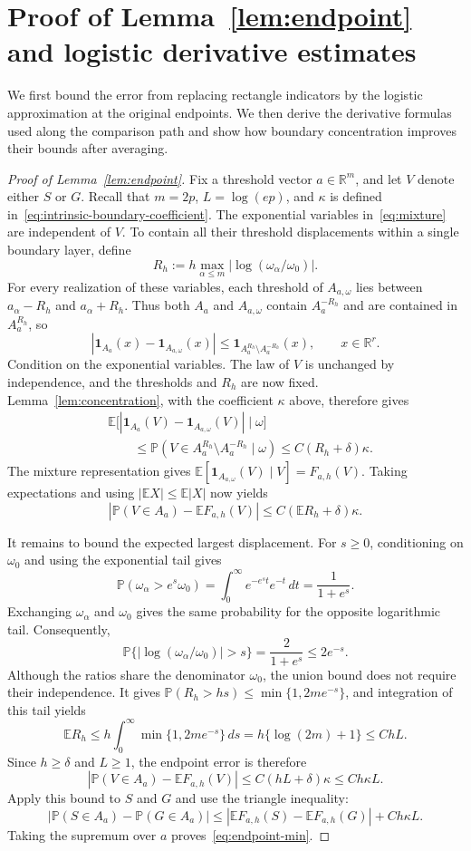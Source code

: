 \documentclass[11pt,letterpaper]{article}
\theoremstyle{remark}
\newcommand{\E}{\mathbb E}
\newcommand{\Pp}{\mathbb P}
\newcommand{\R}{\mathbb R}
\newcommand{\ind}{\mathbf 1}
\begin{document}
\section{Proof of Lemma~\ref*{lem:endpoint} and logistic derivative estimates}\label{appx-sec:smoothing}
We first bound the error from replacing rectangle indicators by the
logistic approximation at the original endpoints. We then derive
the derivative formulas used along the comparison path and show how
boundary concentration improves their bounds after averaging.

\begin{proof}[Proof of Lemma~\ref{lem:endpoint}]
Fix a threshold vector $a\in\R^m$, and let $V$ denote either $S$ or
$G$. Recall that $m=2p$, $L=\log(ep)$, and $\kappa$ is defined
in~\eqref{eq:intrinsic-boundary-coefficient}. The exponential variables
in~\eqref{eq:mixture} are independent of $V$. To contain all their
threshold displacements within a single boundary layer, define
\[
 R_h:=h\max_{\alpha\le m}|\log(\omega_\alpha/\omega_0)|.
\]
For every realization of these variables, each threshold of
$A_{a,\omega}$ lies between $a_\alpha-R_h$ and $a_\alpha+R_h$.
Thus both $A_a$ and $A_{a,\omega}$ contain $A_a^{-R_h}$ and are
contained in $A_a^{R_h}$, so
\[
 |\ind_{A_a}(x)-\ind_{A_{a,\omega}}(x)|
 \le\ind_{A_a^{R_h}\setminus A_a^{-R_h}}(x),
 \qquad x\in\R^r.
\]
Condition on the exponential variables. The law of $V$ is unchanged
by independence, and the thresholds and $R_h$ are now fixed.
Lemma~\ref{lem:concentration}, with the coefficient $\kappa$ above,
therefore gives
\[
 \begin{aligned}
 &\E\bigl[
   |\ind_{A_a}(V)-\ind_{A_{a,\omega}}(V)|\mid\omega\bigr]\\
 &\hspace{2em}\le
 \Pp(V\in A_a^{R_h}\setminus A_a^{-R_h}\mid\omega)
 \le C(R_h+\delta)\kappa.
 \end{aligned}
\]
The mixture representation gives
$\E[\ind_{A_{a,\omega}}(V)\mid V]=F_{a,h}(V)$.
Taking expectations and using $|\E X|\le\E|X|$ now yields
\[
 |\Pp(V\in A_a)-\E F_{a,h}(V)|
 \le C(\E R_h+\delta)\kappa.
\]

It remains to bound the expected largest displacement. For $s\ge0$,
conditioning on $\omega_0$ and using the exponential tail gives
\[
 \Pp(\omega_\alpha>e^s\omega_0)
 =\int_0^\infty e^{-e^s t}e^{-t}\,dt
 =\frac1{1+e^s}.
\]
Exchanging $\omega_\alpha$ and $\omega_0$ gives the same probability for
the opposite logarithmic tail. Consequently,
\[
 \Pp\{|\log(\omega_\alpha/\omega_0)|>s\}
 =\frac2{1+e^s}\le2e^{-s}.
\]
Although the ratios share the denominator $\omega_0$, the union bound
does not require their independence. It gives
$\Pp(R_h>hs)\le\min\{1,2me^{-s}\}$, and integration of this tail yields
\[
 \E R_h
 \le h\int_0^\infty\min\{1,2me^{-s}\}\,ds
 =h\{\log(2m)+1\}\le ChL.
\]
Since $h\ge\delta$ and $L\ge1$, the endpoint error is therefore
\[
 |\Pp(V\in A_a)-\E F_{a,h}(V)|
 \le C(hL+\delta)\kappa\le Ch\kappa L.
\]
Apply this bound to $S$ and $G$ and use the triangle inequality:
\[
 |\Pp(S\in A_a)-\Pp(G\in A_a)|
 \le|\E F_{a,h}(S)-\E F_{a,h}(G)|+Ch\kappa L.
\]
Taking the supremum over $a$ proves~\eqref{eq:endpoint-min}.
\end{proof}
\end{document}
